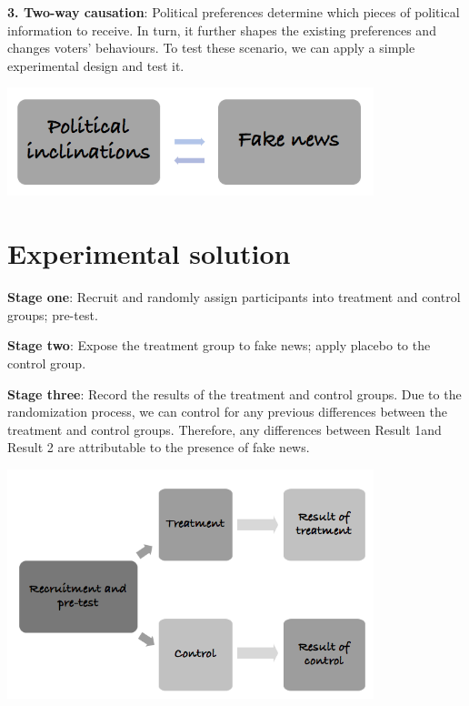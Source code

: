 \documentclass[]{book}
\begin{document}
\textbf{3. Two-way causation}: Political preferences determine which pieces of political information to receive. In turn, it further shapes the existing preferences and changes voters' behaviours. To test these scenario, we can apply a simple experimental design and test it.

\includegraphics[width=0.8\textwidth,height=\textheight]{fig/scenario3.png}

\hypertarget{experimental-solution}{%
\section{Experimental solution}\label{experimental-solution}}

\textbf{Stage one}: Recruit and randomly assign participants into treatment and control groups; pre-test.

\textbf{Stage two}: Expose the treatment group to fake news; apply placebo to the control group.

\textbf{Stage three}: Record the results of the treatment and control groups. Due to the randomization process, we can control for any previous differences between the treatment and control groups. Therefore, any differences between Result 1and Result 2 are attributable to the presence of fake news.

\includegraphics[width=0.8\textwidth,height=\textheight]{fig/stage1.png}
\end{document}
